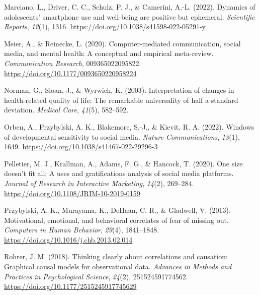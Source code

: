 \documentclass[
  man,mask,floatsintext]{apa7}
\newlength{\cslhangindent}
\newlength{\cslentryspacingunit} %
\newenvironment{CSLReferences}[2] %
 {%
  \setlength{\parindent}{0pt}
  \ifodd #1
  \let\oldpar\par
  \def\par{\hangindent=\cslhangindent\oldpar}
  \fi
  \setlength{\parskip}{#2\cslentryspacingunit}
 }%
 {}
\begin{document}
\begin{CSLReferences}{1}{0}
\leavevmode{}%
Marciano, L., Driver, C. C., Schulz, P. J., \& Camerini, A.-L. (2022). Dynamics of adolescents' smartphone use and well-being are positive but ephemeral. \emph{Scientific Reports}, \emph{12}(1), 1316. \url{https://doi.org/10.1038/s41598-022-05291-y}

\leavevmode{}%
Meier, A., \& Reinecke, L. (2020). Computer-mediated communication, social media, and mental health: {A} conceptual and empirical meta-review. \emph{Communication Research}, 009365022095822. \url{https://doi.org/10.1177/0093650220958224}

\leavevmode{}%
Norman, G., Sloan, J., \& Wyrwich, K. (2003). Interpretation of changes in health-related quality of life: {The} remarkable universality of half a standard deviation. \emph{Medical Care}, \emph{41}(5), 582--592.

\leavevmode{}%
Orben, A., Przybylski, A. K., Blakemore, S.-J., \& Kievit, R. A. (2022). Windows of developmental sensitivity to social media. \emph{Nature Communications}, \emph{13}(1), 1649. \url{https://doi.org/10.1038/s41467-022-29296-3}

\leavevmode{}%
Pelletier, M. J., Krallman, A., Adams, F. G., \& Hancock, T. (2020). One size doesn't fit all: A uses and gratifications analysis of social media platforms. \emph{Journal of Research in Interactive Marketing}, \emph{14}(2), 269--284. \url{https://doi.org/10.1108/JRIM-10-2019-0159}

\leavevmode{}%
Przybylski, A. K., Murayama, K., DeHaan, C. R., \& Gladwell, V. (2013). Motivational, emotional, and behavioral correlates of fear of missing out. \emph{Computers in Human Behavior}, \emph{29}(4), 1841--1848. \url{https://doi.org/10.1016/j.chb.2013.02.014}

\leavevmode{}%
Rohrer, J. M. (2018). Thinking clearly about correlations and causation: {Graphical} causal models for observational data. \emph{Advances in Methods and Practices in Psychological Science}, \emph{24}(2), 251524591774562. \url{https://doi.org/10.1177/2515245917745629}


\end{CSLReferences}
\end{document}
